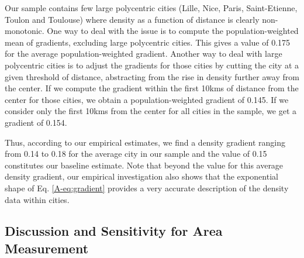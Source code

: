 \documentclass[11pt]{report}
\begin{document}
Our sample contains few large polycentric cities (Lille, Nice, Paris, Saint-Etienne, Toulon and Toulouse) where density as a function of distance is clearly non-monotonic. One way to deal with the issue is to compute the population-weighted mean of gradients, excluding large polycentric cities. This gives a value of 0.175 for the average population-weighted gradient. Another way to deal with large polycentric cities is to adjust the gradients for those cities by cutting the city at a given threshold of distance, abstracting from the rise in density further away from the center. If we compute the gradient within the first 10kms of distance from the center for those cities, we obtain a population-weighted gradient of 0.145. If we consider only the first 10kms from the center for all cities in the sample, we get a gradient of 0.154. 


Thus, according to our empirical estimates, we find a density gradient ranging from 0.14 to 0.18 for the average city in our sample and the value of 0.15 constitutes our baseline estimate. Note that beyond the value for this average density gradient, our empirical investigation also shows that the exponential shape of Eq. \ref{A-eq:gradient} provides a very accurate description of the density data within cities.





\subsection{Discussion and Sensitivity for Area Measurement}\label{A-sec:consistency}
\end{document}
